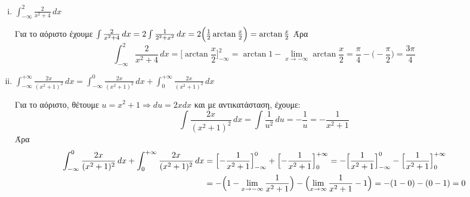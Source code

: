 \begin{enumerate}[i)]
  \item $ \boxed{\int _{- \infty}^{2} \frac{2}{x^{2}+4}\,{dx}} $
    \begin{solution}
      Για το αόριστο έχουμε $ \int \frac{2}{x^{2}+4} \,{dx} = 2\int \frac{1}{2^{2}+x^{2}}
      \,{dx} = 2 \Bigl(\frac{1}{2} \arctan{\frac{x}{2}}\Bigr) =
      \arctan{\frac{x}{2}} $
      Άρα
      \[
        \int _{- \infty}^{2} \frac{2}{x^{2}+4}\,{dx} = 
        \bigl[\arctan{\frac{x}{2}}\bigr]_{- \infty}^{2} = 
        \arctan{1} - \lim_{x \to - \infty} \arctan{\frac{x}{2}} =
        \frac{\pi}{4} - \bigl(- \frac{\pi}{2}\bigr) = \frac{3 \pi}{4} 
      \]
    \end{solution}

  \item $ \boxed{\int _{- \infty}^{+ \infty} \frac{2x}{(x^{2}+1)^{2}} \,{dx}} = 
    \int _{- \infty}^{0} \frac{2x}{(x^{2}+1)^{2}} \,{dx} + 
    \int _{0}^{+ \infty} \frac{2x}{(x^{2}+1)^{2}} \,{dx} $
    \begin{solution}
      Για το αόριστο, θέτουμε $ u = x^{2}+1 \Rightarrow du = 2x dx $ και με 
      αντικατάσταση, έχουμε:
      \[
        \int \frac{2x}{(x^{2}+1)^{2}} \,{dx} = \int \frac{1}{u^{2}} \,{du} = -
        \frac{1}{u} = - \frac{1}{x^{2}+1}
      \] 
      Άρα
      \begin{align*}
        \int _{- \infty}^{0} \frac{2x}{(x^{2}+1)^{2}} \,{dx} + 
        \int _{0}^{+ \infty} \frac{2x}{(x^{2}+1)^{2}} \,{dx} 
    &= 
    \Bigl[- \frac{1}{x^{2}+1} \Bigr]_{- \infty}^{0} + \Bigl[- \frac{1}{x^{2}+1}
    \Bigr]_{0}^{+ \infty} = 
    -\Bigl[\frac{1}{x^{2}+1} \Bigr]_{- \infty}^{0} - \Bigl[\frac{1}{x^{2}+1}
    \Bigr]_{0}^{+ \infty} \\ 
    &= 
    -\Bigl(1 - \lim_{x \to - \infty} \frac{1}{x^{2}+1}\Bigr) - 
    \Bigl( \lim_{x \to \infty} \frac{1}{x^{2}+1} - 1\Bigr) = -(1-0)-(0-1) = 0
      \end{align*} 
    \end{solution}


\end{enumerate}
